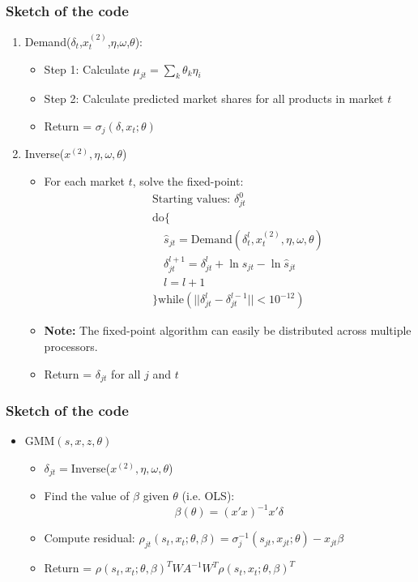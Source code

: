 \documentclass[handout]{beamer}
\theoremstyle{plain}
\begin{document}
\begin{frame}
\frametitle{Sketch of the code}
{\footnotesize    \begin{enumerate}
    \item Demand($\delta_t$,$x^{(2)}_t$,$\eta$,$\omega$,$\theta$):
        \begin{itemize}
        \item Step 1: Calculate $\mu_{jt}=\sum_k \theta_k\eta_i$
        \item Step 2: Calculate predicted market shares for all products in market $t$
        \item Return = $\sigma_j(\delta,x_t;\theta)$
        \end{itemize}
    \item Inverse($x^{(2)},\eta,\omega,\theta$)
	\begin{itemize}
        \item For each market $t$, solve the fixed-point:
        \begin{eqnarray*}
        &&\textrm{Starting values: } \delta_{jt}^0\\
        &&\textrm{do}\{\\
       && \quad		\hat{s}_{jt}=\textrm{Demand}(\delta^l_t,x^{(2)}_t,\eta,\omega,\theta)\\
       &&\quad \delta^{l+1}_{jt}=\delta_{jt}^l+\ln s_{jt}-\ln \hat{s}_{jt} \\
       &&\quad l=l+1\\
       &&\}\textrm{while}(||\delta_{jt}^{l}-\delta_{jt}^{l-1}||<10^{-12})
        \end{eqnarray*}
        \item {\bf Note:} The fixed-point algorithm can easily be distributed across multiple processors.
        \item Return = $\delta_{jt}$ for all $j$ and $t$
        \end{itemize}        
    \end{enumerate}   }
\end{frame}

\begin{frame}
\frametitle{Sketch of the code}
\begin{itemize}
    \item GMM$(s,x,z,\theta)$
    \begin{itemize}
    \item $\delta_{jt}=$Inverse($x^{(2)},\eta,\omega,\theta$)
        \item Find the value of $\beta$ given $\theta$ (i.e. OLS):
    $$\beta(\theta)=(x'x)^{-1}x'\delta$$
    \item Compute residual: $\rho_{jt}(s_t,x_t;\theta,\beta)=\sigma_{j}^{-1}(s_{jt},x_{jt};\theta)-x_{jt}\beta$
	  \item Return = $\rho(s_t,x_t;\theta,\beta)^TWA^{-1}W^T\rho(s_t,x_t;\theta,\beta)^T$
   \end{itemize}


\end{itemize}
\end{frame}
\end{document}
